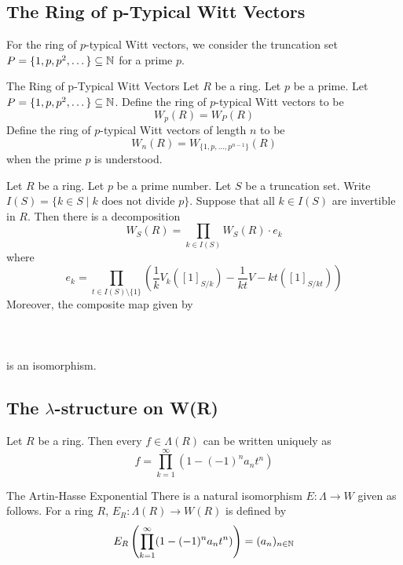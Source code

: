 \documentclass[a4paper]{article}
\begin{document}
\subsection{The Ring of p-Typical Witt Vectors}
For the ring of $p$-typical Witt vectors, we consider the truncation set $P=\{1,p,p^2,\dots\}\subseteq\mathbb{N}$ for a prime $p$. 

\begin{defn}{The Ring of p-Typical Witt Vectors}{} Let $R$ be a ring. Let $p$ be a prime. Let $P=\{1,p,p^2,\dots\}\subseteq\mathbb{N}$. Define the ring of $p$-typical Witt vectors to be $$W_p(R)=W_P(R)$$ Define the ring of $p$-typical Witt vectors of length $n$ to be $$W_n(R)=W_{\{1,p,\dots,p^{n-1}\}}(R)$$ when the prime $p$ is understood. 
\end{defn}

\begin{thm}{}{} Let $R$ be a ring. Let $p$ be a prime number. Let $S$ be a truncation set. Write $I(S)=\{k\in S\;|\;k\text{ does not divide }p\}$. Suppose that all $k\in I(S)$ are invertible in $R$. Then there is a decomposition $$W_S(R)=\prod_{k\in I(S)}W_S(R)\cdot e_k$$ where $$e_k=\prod_{t\in I(S)\setminus\{1\}}\left(\frac{1}{k}V_k([1]_{S/k})-\frac{1}{kt}V-{kt}([1]_{S/kt})\right)$$ Moreover, the composite map given by \\~\\
\\~\\
is an isomorphism. 
\end{thm}

\subsection{The $\lambda$-structure on W(R)}
\begin{lmm}{}{} Let $R$ be a ring. Then every $f\in\Lambda(R)$ can be written uniquely as $$f=\prod_{k=1}^\infty(1-(-1)^na_nt^n)$$
\end{lmm}

\begin{thm}{The Artin-Hasse Exponential}{} There is a natural isomorphism $E:\Lambda\rightarrow W$ given as follows. For a ring $R$, $E_R:\Lambda(R)\to W(R)$ is defined by $$E_R\left(\prod_{k=1}^\infty(1-(-1)^na_nt^n)\right)=(a_n)_{n\in\mathbb{N}}$$
\end{thm}
\end{document}
